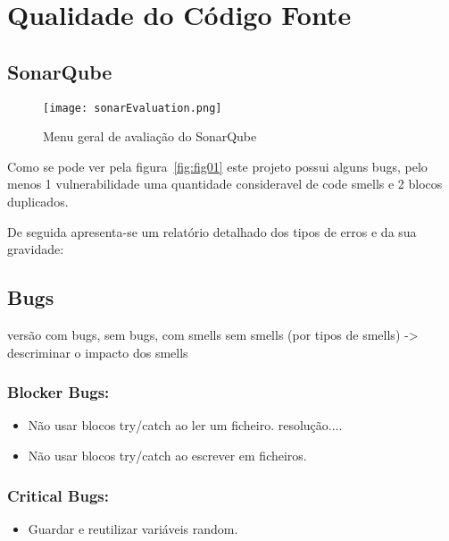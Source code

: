\section{Qualidade do Código Fonte}

\subsection{SonarQube}

\begin{figure}[H]

  \centering

  \texttt{[image: sonarEvaluation.png]}

  \caption {Menu geral de avaliação do SonarQube}

  \label {fig01}

\end{figure}


\par Como se pode ver pela figura~\ref{fig:fig01} este projeto possui alguns bugs, pelo menos 1 vulnerabilidade uma quantidade consideravel de code smells e 2 blocos duplicados.


De seguida apresenta-se um relatório detalhado dos tipos de erros e da sua gravidade:
\subsection{Bugs}
versão com bugs, sem bugs, com smells sem smells (por tipos de smells) -> descriminar o impacto dos smells
\subsubsection{Blocker Bugs:}
\begin{itemize}
\item Não usar blocos try/catch ao ler um ficheiro.\newline
resolução....
\item Não usar blocos try/catch ao escrever em ficheiros.\newline
\end{itemize}

\subsubsection{Critical Bugs:}
\begin{itemize}
\item Guardar e reutilizar variáveis random. \newline

\end{itemize}

